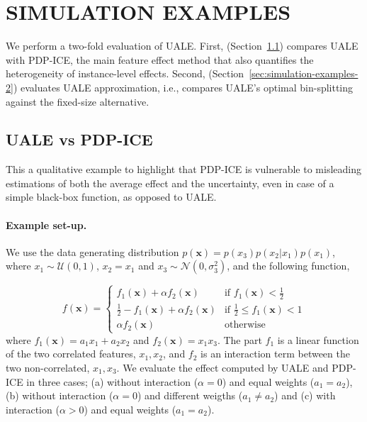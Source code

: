 \documentclass[twoside]{article}
\begin{document}


\section{SIMULATION EXAMPLES}
\label{sec:simulation-examples}

We perform a two-fold evaluation of UALE. First,
(Section~\ref{sec:simulation-examples-1}) compares UALE with PDP-ICE,
the main feature effect method that also quantifies the heterogeneity
of instance-level effects. Second,
(Section~\ref{sec:simulation-examples-2}) evaluates UALE
approximation, i.e., compares UALE's optimal bin-splitting against the
fixed-size alternative.

\subsection{UALE vs PDP-ICE}
\label{sec:simulation-examples-1}

This a qualitative example to highlight that PDP-ICE is vulnerable to
misleading estimations of both the average effect and the uncertainty,
even in case of a simple black-box function, as opposed to UALE.

\paragraph{Example set-up.}
We use the data generating distribution
\(p(\mathbf{x}) = p(x_3)p(x_2|x_1)p(x_1)\), where
\(x_1 \sim \mathcal{U}(0,1)\), \(x_2 = x_1\) and
\(x_3 \sim \mathcal{N}(0, \sigma_3^2)\), and the following function,

\begin{equation}
  \label{eq:synth-ex-1-function}
  f(\mathbf{x}) = \begin{cases}
                    f_1(\mathbf{x}) + \alpha f_2(\mathbf{x}) & \text{if $f_1(\mathbf{x}) < \frac{1}{2}$ }\\
                    \frac{1}{2} - f_1(\mathbf{x}) + \alpha f_2(\mathbf{x}) & \text{if $\frac{1}{2} \leq f_1(\mathbf{x}) < 1$}\\
                    \alpha f_2(\mathbf{x}) &\text{otherwise}
                  \end{cases}
\end{equation}
%
where \(f_1(\mathbf{x}) = a_1 x_1 + a_2 x_2\) and
\(f_2(\mathbf{x}) = x_1x_3\). The part \(f_1\) is a linear function of
the two correlated features, \(x_1, x_2\), and \(f_2\) is an
interaction term between the two non-correlated, \(x_1, x_3\).  We
evaluate the effect computed by UALE and PDP-ICE in three cases; (a)
without interaction (\(\alpha=0\)) and equal weights (\(a_1=a_2\)),
(b) without interaction (\(\alpha=0\)) and different weigths
(\( a_1 \neq a_2 \)) and (c) with interaction (\(\alpha > 0\)) and
equal weights (\(a_1=a_2\)).
\end{document}
